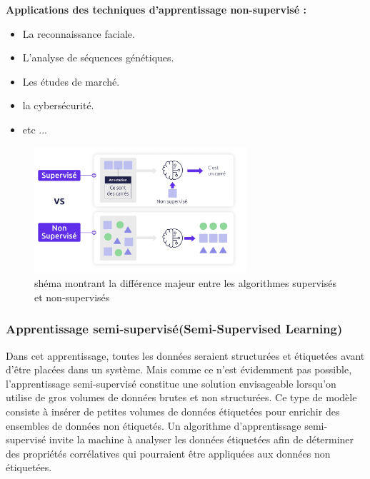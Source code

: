 \vspace{1cm}

\textbf{Applications des techniques d'apprentissage non-supervisé :}
\begin{itemize}[label={*}]
\item La reconnaissance faciale.
\item L'analyse de séquences génétiques.
\item Les études de marché.
\item la cybersécurité.
\item etc ...
\end{itemize}

     \begin{figure}[htbp]
     \centering    
     \includegraphics[width=0.7\textwidth,height=0.3\textheight]{img/non_supervisé_vs_supervisé.png}
     \caption{shéma montrant la différence majeur entre les algorithmes supervisés et non-supervisés \cite{non_supervisé_vs_supervisé}}
     \label{fig:example7}
     \end{figure}


\subsubsection{Apprentissage semi-supervisé(Semi-Supervised Learning) }
Dans cet apprentissage, toutes les données seraient structurées et étiquetées avant d'être placées dans un système. Mais comme ce n'est évidemment pas possible, l'apprentissage semi-supervisé constitue une solution envisageable lorsqu'on utilise de gros volumes de données brutes et non structurées. Ce type de modèle consiste à insérer de petites volumes de données étiquetées pour enrichir des ensembles de données non étiquetés. Un algorithme d'apprentissage semi-supervisé invite la machine à analyser les données étiquetées afin de déterminer des propriétés corrélatives qui pourraient être appliquées aux données non étiquetées.\cite{what_is_machine_learning}

